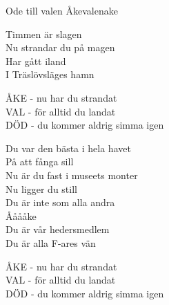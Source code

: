 \begin{song}{Ode till valen Åke}{valenake}
\begin{vers}
Timmen är slagen\\
Nu strandar du på magen\\
Har gått iland\\
I Träslövsläges hamn\\
\end{vers}
\begin{vers}
ÅKE - nu har du strandat\\
VAL - för alltid du landat\\
DÖD - du kommer aldrig simma igen\\
\end{vers}
\begin{vers}
Du var den bästa i hela havet\\
På att fånga sill\\
Nu är du fast i museets monter\\
Nu ligger du still\\
Du är inte som alla andra\\
Ååååke\\
Du är vår hedersmedlem\\
Du är alla F-ares vän\\
\end{vers}
\begin{vers}
ÅKE - nu har du strandat\\
VAL - för alltid du landat\\
DÖD - du kommer aldrig simma igen\\
\end{vers}
\end{song}
